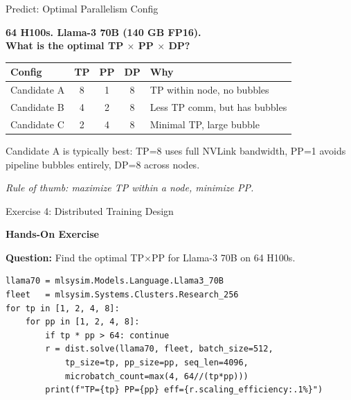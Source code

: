 \documentclass[aspectratio=169, 12pt]{beamer}
\begin{document}
\begin{frame}{Predict: Optimal Parallelism Config}

\centering
\Large\bfseries
64 H100s. Llama-3 70B (140 GB FP16).\\[0.3cm]
\normalsize
What is the optimal TP $\times$ PP $\times$ DP?\\[0.5cm]

\pause

\small
\begin{tabular}{lcccl}
\toprule
\textbf{Config} & \textbf{TP} & \textbf{PP} & \textbf{DP} & \textbf{Why} \\
\midrule
Candidate A & 8 & 1 & 8 & TP within node, no bubbles \\
Candidate B & 4 & 2 & 8 & Less TP comm, but has bubbles \\
Candidate C & 2 & 4 & 8 & Minimal TP, large bubble \\
\bottomrule
\end{tabular}

\vspace{0.3cm}
\pause
\alert{Candidate A is typically best:} TP=8 uses full NVLink bandwidth,
PP=1 avoids pipeline bubbles entirely, DP=8 across nodes.

\vspace{0.2cm}
\textit{Rule of thumb: maximize TP within a node, minimize PP.}
\end{frame}

\begin{frame}[fragile]{Exercise 4: Distributed Training Design}

\centering
\Large\bfseries
Hands-On Exercise\\[0.5cm]
\normalsize

\textbf{Question:} Find the optimal TP$\times$PP for Llama-3 70B on 64 H100s.

\vspace{0.3cm}
\begin{lstlisting}
llama70 = mlsysim.Models.Language.Llama3_70B
fleet   = mlsysim.Systems.Clusters.Research_256
for tp in [1, 2, 4, 8]:
    for pp in [1, 2, 4, 8]:
        if tp * pp > 64: continue
        r = dist.solve(llama70, fleet, batch_size=512,
            tp_size=tp, pp_size=pp, seq_len=4096,
            microbatch_count=max(4, 64//(tp*pp)))
        print(f"TP={tp} PP={pp} eff={r.scaling_efficiency:.1%}")
\end{lstlisting}
\end{frame}
\end{document}
